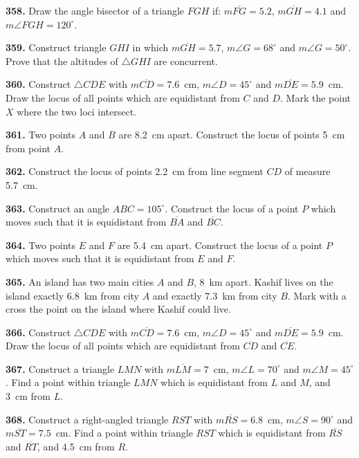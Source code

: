 \documentclass[11pt]{article}
\begin{document}
\bigskip
\noindent\textbf{358.} Draw the angle bisector of a triangle $FGH$ if: $m\overline{FG}=5.2$, $m\overline{GH}=4.1$ and $m\angle FGH = 120^{\circ}$.

\bigskip
\noindent\textbf{359.} Construct triangle $GHI$ in which $m\overline{GH}=5.7$, $m\angle G = 68^{\circ}$ and $m\angle G = 50^{\circ}$. Prove that the altitudes of $\triangle GHI$ are concurrent.

\bigskip
\noindent\textbf{360.} Construct $\triangle CDE$ with $m\overline{CD}=7.6$~cm, $m\angle D = 45^{\circ}$ and $m\overline{DE}=5.9$~cm. Draw the locus of all points which are equidistant from $C$ and $D$. Mark the point $X$ where the two loci intersect.

\bigskip
\noindent\textbf{361.} Two points $A$ and $B$ are 8.2~cm apart. Construct the locus of points 5~cm from point $A$.

\bigskip
\noindent\textbf{362.} Construct the locus of points 2.2~cm from line segment $CD$ of measure 5.7~cm.

\bigskip
\noindent\textbf{363.} Construct an angle $ABC = 105^{\circ}$. Construct the locus of a point $P$ which moves such that it is equidistant from $\overline{BA}$ and $\overline{BC}$.

\bigskip
\noindent\textbf{364.} Two points $E$ and $F$ are 5.4~cm apart. Construct the locus of a point $P$ which moves such that it is equidistant from $E$ and $F$.

\bigskip
\noindent\textbf{365.} An island has two main cities $A$ and $B$, 8~km apart. Kashif lives on the island exactly 6.8~km from city $A$ and exactly 7.3~km from city $B$. Mark with a cross the point on the island where Kashif could live.

\bigskip
\noindent\textbf{366.} Construct $\triangle CDE$ with $m\overline{CD}=7.6$~cm, $m\angle D = 45^{\circ}$ and $m\overline{DE}=5.9$~cm. Draw the locus of all points which are equidistant from $\overline{CD}$ and $\overline{CE}$.

\bigskip
\noindent\textbf{367.} Construct a triangle $LMN$ with $m\overline{LM}=7$~cm, $m\angle L = 70^{\circ}$ and $m\angle M = 45^{\circ}$. Find a point within triangle $LMN$ which is equidistant from $L$ and $M$, and 3~cm from $L$.

\bigskip
\noindent\textbf{368.} Construct a right-angled triangle $RST$ with $m\overline{RS}=6.8$~cm, $m\angle S = 90^{\circ}$ and $m\overline{ST}=7.5$~cm. Find a point within triangle $RST$ which is equidistant from $\overline{RS}$ and $\overline{RT}$, and 4.5~cm from $R$.
\end{document}
